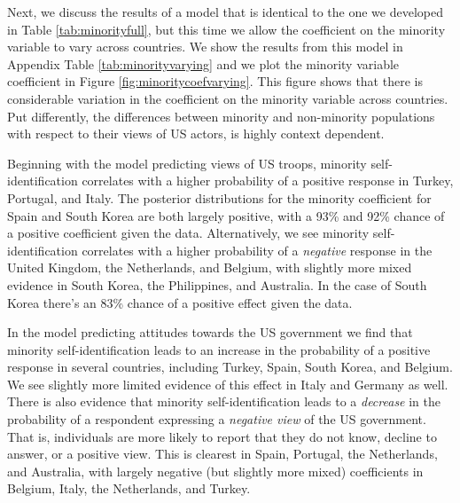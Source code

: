 Next, we discuss the results of a model that is identical to the one we developed in Table \ref{tab:minorityfull}, but this time we allow the coefficient on the minority variable to vary across countries. We show the results from this model in Appendix Table \ref{tab:minorityvarying} and we plot the minority variable coefficient in Figure \ref{fig:minoritycoefvarying}. This figure shows that there is considerable variation in the coefficient on the minority variable across countries. Put differently, the differences between minority and non-minority populations with respect to their views of US actors, is highly context dependent. 

Beginning with the model predicting views of US troops, minority self-identification correlates with a higher probability of a positive response in Turkey, Portugal, and Italy. The posterior distributions for the minority coefficient for Spain and South Korea are both largely positive, with a 93\% and 92\% chance of a positive coefficient given the data. Alternatively, we see minority self-identification correlates with a higher probability of a \textit{negative} response in the United Kingdom, the Netherlands, and Belgium, with slightly more mixed evidence in South Korea, the Philippines, and Australia. In the case of South Korea there's an 83\% chance of a positive effect given the data.


In the model predicting attitudes towards the US government we find that minority self-identification leads to an increase in the probability of a positive response in several countries, including Turkey, Spain, South Korea, and Belgium. We see slightly more limited evidence of this effect in Italy and Germany as well. There is also evidence that minority self-identification leads to a \textit{decrease} in the probability of a respondent expressing a \textit{negative view} of the US government. That is, individuals are more likely to report that they do not know, decline to answer, or a positive view. This is clearest in Spain, Portugal, the Netherlands, and Australia, with largely negative (but slightly more mixed) coefficients in Belgium, Italy, the Netherlands, and Turkey. 

